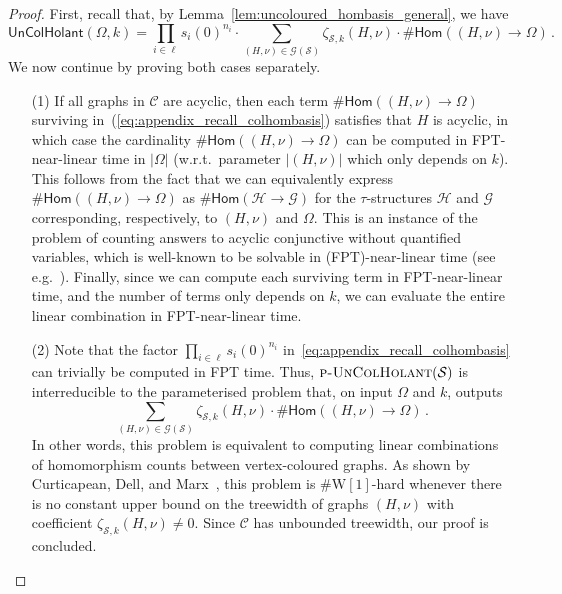 \documentclass[authorcolumns,numberwithinsect]{no-lipics-v2022}
\newcommand{\homs}[2]{\mathsf{Hom}(#1 \to #2)}
\newcommand{\W}{\mathrm{W}}
\begin{document}
\begin{proof}
   First, recall that, by Lemma~\ref{lem:uncoloured_hombasis_general}, we have
   \begin{equation}\label{eq:appendix_recall_colhombasis}
       \mathsf{UnColHolant}(\Omega,k) = \prod_{i\in \ell}s_i(0)^{n_i} \cdot \sum_{(H,\nu)\in \mathcal{G}(\mathcal{S})} \zeta_{\mathcal{S},k}(H,\nu) \cdot \#\homs{(H,\nu)}{\Omega}\,.
   \end{equation}
    We now continue by proving both cases separately.
    \begin{itemize}
        \item[(1)] If all graphs in $\mathcal{C}$ are acyclic, then each term  $\#\homs{(H,\nu)}{\Omega}$ surviving in~(\ref{eq:appendix_recall_colhombasis}) satisfies that $H$ is acyclic, in which case the cardinality $\#\homs{(H,\nu)}{\Omega}$ can be computed in FPT-near-linear time in $|\Omega|$ (w.r.t.\ parameter $|(H,\nu)|$ which only depends on $k$). This follows from the fact that we can equivalently express $\#\homs{(H,\nu)}{\Omega}$ as $\#\homs{\mathcal{H}}{\mathcal{G}}$ for the $\tau$-structures $\mathcal{H}$ and $\mathcal{G}$ corresponding, respectively, to $(H,\nu)$ and $\Omega$. This is an instance of the problem of counting answers to acyclic conjunctive without quantified variables, which is well-known to be solvable in (FPT)-near-linear time (see e.g.\ \cite[Theorem 12]{BraultBaron13}). Finally, since we can compute each surviving term in FPT-near-linear time, and the number of terms only depends on $k$, we can evaluate the entire linear combination in FPT-near-linear time.
        \item[(2)] Note that the factor $\prod_{i\in \ell}s_i(0)^{n_i}$ in~\eqref{eq:appendix_recall_colhombasis} can trivially be computed in FPT time. Thus, $\text{\sc{p-UnColHolant}}(\mathcal{S})$ is interreducible to the parameterised problem that, on input $\Omega$ and $k$, outputs
        \[\sum_{(H,\nu)\in \mathcal{G}(\mathcal{S})} \zeta_{\mathcal{S},k}(H,\nu) \cdot \#\homs{(H,\nu)}{\Omega}\,.\]
        In other words, this problem is equivalent to computing linear combinations of homomorphism counts between vertex-coloured graphs. As shown by Curticapean, Dell, and Marx~\cite[Lemma 3.8 and Remark 3.9]{CurticapeanDM17}, this problem is $\#\W[1]$-hard whenever there is no constant upper bound on the treewidth of graphs $(H,\nu)$ with coefficient $\zeta_{\mathcal{S},k}(H,\nu)\neq 0$. Since $\mathcal{C}$ has unbounded treewidth, our proof is concluded.
    \end{itemize}
\end{proof}
\end{document}
